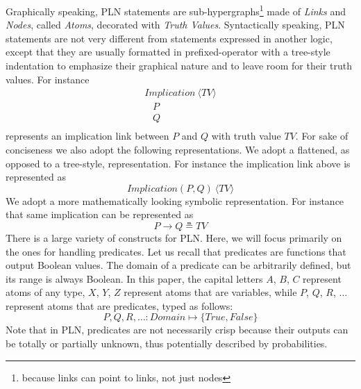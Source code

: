 \documentclass[runningheads]{llncs}
\newcommand{\SP}{\;\;\;}
\newcommand{\TTrue}{\textit{True}}
\newcommand{\TFalse}{\textit{False}}
\newcommand{\TAtom}{\textit{Atom}}
\newcommand{\TImpl}{\textit{Implication}}
\newcommand{\TTV}{\textit{TV}}
\newcommand{\TBTV}{\langle \TTV \rangle}
\newcommand{\limp}{\rightarrow}
\begin{document}
Graphically speaking, PLN statements are
sub-hypergraphs\footnote{because links can point to links, not just
  nodes} made of \emph{Links} and \emph{Nodes}, called \emph{Atoms},
decorated with \emph{Truth Values}.  Syntactically speaking, PLN
statements are not very different from statements expressed in another
logic, except that they are usually formatted in prefixed-operator
with a tree-style indentation to emphasize their graphical nature and
to leave room for their truth values.  For instance
$$
\begin{array}{l}
  \TImpl\ \TBTV\\
  \SP P\\
  \SP Q\\
\end{array}
$$
represents an implication link between $P$ and $Q$ with truth value
$\TTV$.  For sake of conciseness we also adopt the following
representations.  We adopt a flattened, as opposed to a tree-style,
representation.  For instance the implication link above is
represented as
$$\TImpl(P, Q)\ \TBTV$$
We adopt a more mathematically looking symbolic representation.  For
instance that same implication can be represented as
$$P \limp Q \measeq \TTV$$
There is a large variety of constructs for PLN.  Here, we will focus
primarily on the ones for handling predicates.  Let us recall that
predicates are functions that output Boolean values.  The domain of a
predicate can be arbitrarily defined, but its range is always Boolean.
In this paper, the capital letters $A$, $B$, $C$ represent atoms of
any type, $X$, $Y$, $Z$ represent atoms that are variables, while $P$,
$Q$, $R$, $\dots$ represent atoms that are predicates, typed as follows:
$$P, Q, R, \hdots: \textit{Domain} \mapsto \{\TTrue, \TFalse\}$$
Note that in PLN, predicates are not necessarily crisp because their
outputs can be totally or partially unknown, thus potentially
described by probabilities.
\end{document}
